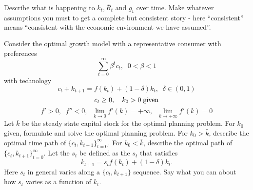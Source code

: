 \medskip
{} Describe what is happening to $k_t,\bar R_t$ and $g_t$ over time. Make whatever assumptions you must to get a complete but consistent story - here ``consistent'' means ``consistent with the economic environment we have assumed''.

\medskip
{}
\medskip \noindent
Consider the optimal growth model with a representative consumer with preferences
$$\sum_{t=0}^\infty \beta^tc_t , \;\;  0< \beta<1$$  with technology
$$c_t+k_{t+1}=f(k_t)+(1-\delta)k_t,\;\; \delta \in (0,1)$$
$$c_t\geq 0, \quad k_0>0 \;\hbox{given} $$
$$f'>0,\;\;f''<0,\;\;\lim_{k \to 0}f'(k)=+ \infty,\;\;\lim_{k \to +\infty}f'(k)= 0$$
 Let $\bar k$ be
the steady state capital stock for the optimal planning problem.
\medskip
{} For $k_0$ given, formulate and solve the optimal planning problem.
\medskip
{}  For $k_0>\bar k$,  describe the optimal time path of $\{c_t,k_{t+1}\}_{t=0}^\infty$.
\medskip
{} For $k_0<\bar k$, describe the optimal path of $\{c_t,k_{t+1}\}_{t=0}^\infty$.
\medskip
{} Let the  $s_t$ be defined as the $s_t$ that satisfies $$k_{t+1}=s_tf(k_t)+(1-\delta)k_t.$$
 Here $s_t$ in general varies along a $\{c_t,k_{t+1}\}$ sequence. Say what you can about how $s_t$ varies as a function of $k_t$.

